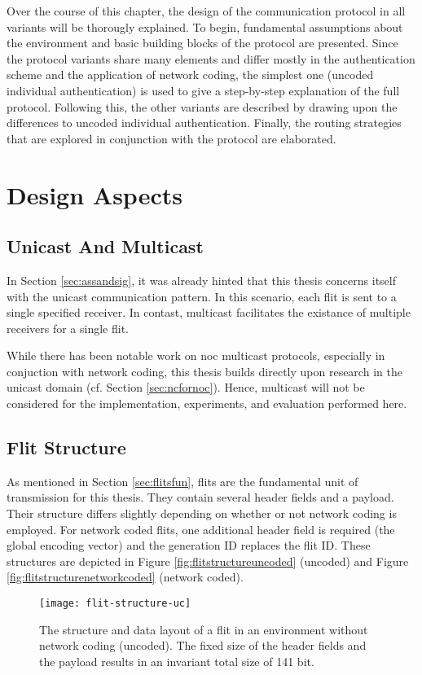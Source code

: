 Over the course of this chapter, the design of the communication protocol in all variants will be thorougly explained. To begin, fundamental
assumptions about the environment and basic building blocks of the protocol are presented. Since the protocol variants share many elements and differ
mostly in the authentication scheme and the application of network coding, the simplest one (uncoded individual authentication) is used to give a
step-by-step explanation of the full protocol. Following this, the other variants are described by drawing upon the differences to uncoded individual
authentication. Finally, the routing strategies that are explored in conjunction with the protocol are elaborated.

\section{Design Aspects}
\subsection{Unicast And Multicast}
In Section \ref{sec:assandsig}, it was already hinted that this thesis concerns itself with the unicast communication pattern. In this scenario, each
flit is sent to a single specified receiver. In contast, multicast facilitates the existance of multiple receivers for a single flit.

While there has been notable work on \gls{noc} multicast protocols, especially in conjuction with network coding, this thesis builds directly upon
research in the unicast domain (cf. Section \ref{sec:ncfornoc}). Hence, multicast will not be considered for the implementation, experiments, and
evaluation performed here.

\subsection{Flit Structure}\label{subsec:flitstructure}
As mentioned in Section \ref{sec:flitsfun}, flits are the fundamental unit of transmission for this thesis. They contain several header fields and a
payload. Their structure differs slightly depending on whether or not network coding is employed. For network coded flits, one additional
header field is required (the global encoding vector) and the generation ID replaces the flit ID. These structures are depicted in Figure
\vref{fig:flitstructureuncoded} (uncoded) and Figure \ref{fig:flitstructurenetworkcoded} (network coded).

\begin{figure}
    \centering
    \texttt{[image: flit-structure-uc]}
    \caption[Structure of a flit without network coding]{The structure and data layout of a flit in an environment without network coding
    (uncoded). The fixed size of the header fields and the payload results in an invariant total size of 141 bit.}
    \label{fig:flitstructureuncoded}
\end{figure}

